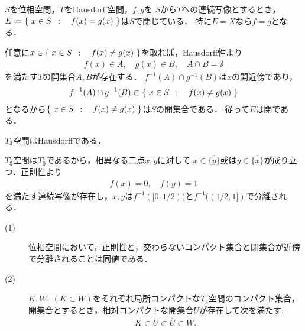 	\begin{screen}
		\begin{thm}[Hausdorff空間値連続写像の等価域は閉]
			$S$を位相空間，$T$をHausdorff空間，$f,g$を
			$S$から$T$への連続写像とするとき，$E \coloneqq \left\{\ x \in S\ \, : \quad f(x) = g(x)\ \right\}$は$S$で閉じている．
			特に$\overline{E}=X$なら$f=g$となる．
		\end{thm}
	\end{screen}
	
	\begin{prf}
		任意に$x \in \left\{\ x \in S\ \, : \quad f(x) \neq g(x)\ \right\}$を取れば，Hausdorff性より
		\begin{align}
			f(x) \in A,\quad g(x) \in B,\quad A \cap B = \emptyset
		\end{align}
		を満たす$T$の開集合$A,B$が存在する．
		$f^{-1}(A) \cap g^{-1}(B)$は$x$の開近傍であり，
		\begin{align}
			f^{-1}(A) \cap g^{-1}(B) \subset \left\{\ x \in S\ \, : \quad f(x) \neq g(x)\ \right\}
		\end{align}
		となるから$\left\{\ x \in S\ \, : \quad f(x) \neq g(x)\ \right\}$は$S$の開集合である．
		従って$E$は閉である．
		\QED
	\end{prf}
	
	\begin{screen}
		\begin{thm}[$T_3 \Longrightarrow T_2$]
			$T_3$空間はHausdorffである．
		\end{thm}
	\end{screen}
	
	\begin{prf}
		$T_3$空間は$T_0$であるから，相異なる二点$x,y$に対して
		$x \in \overline{\{y\}}$或は$y \in \overline{\{x\}}$が成り立つ．正則性より
		\begin{align}
			f(x) = 0,\quad f(y) = 1
		\end{align}
		を満たす連続写像が存在し，$x,y$は$f^{-1}([0,1/2))$と$f^{-1}((1/2,1])$で分離される．
		\QED
	\end{prf}
	
	\begin{screen}
		\begin{thm}[正則空間とは交わらないコンパクト集合と閉集合が近傍で分離される空間]
		\label{thm:each_point_in_regular_space_has_closesd_local_base}\mbox{}
			\begin{description}
				\item[(1)] 位相空間において，正則性と，交わらないコンパクト集合と閉集合が近傍で分離されることは同値である．
					
				\item[(2)]
					$K,W,\ (K \subset W)$をそれぞれ局所コンパクトな$T_3$空間のコンパクト集合，
					開集合とするとき，相対コンパクトな開集合$U$が存在して次を満たす:
					\begin{align}
						K \subset U \subset \overline{U} \subset W.
						\label{eq:thm_each_point_in_regular_space_has_closesd_local_base}
					\end{align}
			\end{description}
		\end{thm}
	\end{screen}
	
